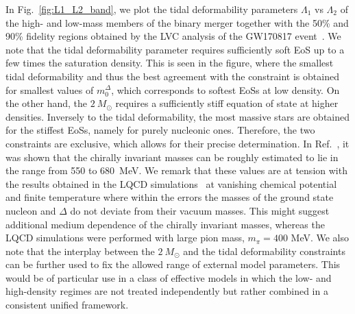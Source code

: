 \documentclass[preprint,showkeys,lengthcheck,nofootinbib,twocolumn,notitlepage,floatfix,superscriptaddress]{revtex4-1}
\begin{document}
In Fig.~\ref{fig:L1_L2_band}, we plot the tidal deformability parameters $\Lambda_1$ vs $\Lambda_2$ of the high- and low-mass members of the binary merger together with the 50\% and 90\% fidelity regions obtained by the LVC analysis of the GW170817 event~\cite{Abbott:2018exr}. We note that the tidal deformability parameter requires sufficiently soft EoS up to a few times the saturation density. This is seen in the figure, where the smallest tidal deformability and thus the best agreement with the constraint is obtained for smallest values of $m_0^\Delta$, which corresponds to softest EoSs at low density. On the other hand, the $2~M_\odot$ requires a sufficiently stiff equation of state at higher densities. Inversely to the tidal deformability, the most massive stars are obtained for the stiffest EoSs, namely for purely nucleonic ones. Therefore, the two constraints are exclusive, which allows for their precise determination. In Ref.~\cite{Marczenko:2021uaj}, it was shown that the chirally invariant masses can be roughly estimated to lie in the range from 550 to 680~MeV. We remark that these values are at tension with the results obtained in the LQCD simulations~\cite{Aarts:2017rrl} at vanishing chemical potential and finite temperature where within the errors the masses of the ground state nucleon and $\Delta$ do not deviate from their vacuum masses. This might suggest additional medium dependence of the chirally invariant masses,
whereas the LQCD simulations were performed with large pion mass, $m_\pi = 400$ MeV.
We also note that the interplay between the $2~M_\odot$ and the tidal deformability constraints can be further used to fix the allowed range of external model parameters. This would be of particular use in a class of effective models in which the low- and high-density regimes are not treated independently but rather combined in a consistent unified framework.
\end{document}
